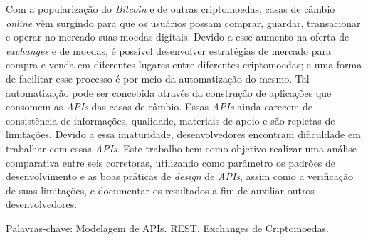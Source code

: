 






\begin{resumo}
	Com a popularização do \textit{Bitcoin} e de outras criptomoedas, casas de câmbio \textit{online} vêm surgindo para que os usuários possam comprar, guardar, transacionar e operar no mercado suas moedas digitais. Devido a esse aumento na oferta de \textit{exchanges} e de moedas, é possível desenvolver estratégias de mercado para compra e venda em diferentes lugares entre diferentes criptomoedas; e uma forma de facilitar esse processo é por meio da automatização do mesmo.
Tal automatização pode ser concebida através da construção de aplicações que consomem as \textit{APIs} das casas de câmbio. Essas \textit{APIs} ainda carecem de consistência de informações, qualidade, materiais de apoio e são repletas de limitações. Devido a essa imaturidade, desenvolvedores encontram dificuldade em trabalhar com essas \textit{APIs}. Este trabalho tem como objetivo realizar uma análise comparativa entre seis corretoras, utilizando como parâmetro os padrões de desenvolvimento e as boas práticas de \textit{design} de \textit{APIs}, assim como a verificação de suas limitações, e documentar os resultados a fim de auxiliar outros desenvolvedores.


  \noindent
  {Palavras-chave}: Modelagem de APIs. REST. Exchanges de Criptomoedas.
\end{resumo}